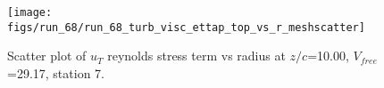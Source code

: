 \begin{figure}[H]
\centering
\texttt{[image: figs/run\_68/run\_68\_turb\_visc\_ettap\_top\_vs\_r\_meshscatter]}
\caption{Scatter plot of $
u_T$ reynolds stress term vs radius at $z/c$=10.00, $V_{free}$=29.17, station 7.}
\end{figure}


